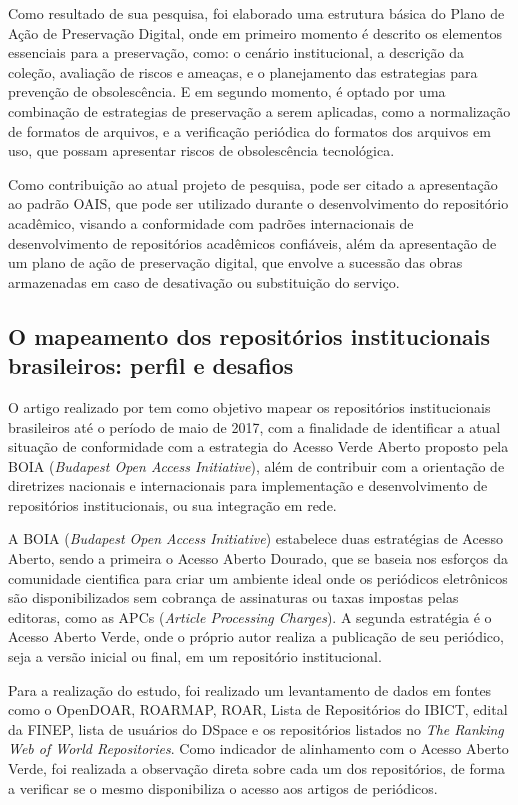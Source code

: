 Como resultado de sua pesquisa, foi elaborado uma estrutura básica
do Plano de Ação de Preservação Digital, onde em primeiro momento
é descrito os elementos essenciais para a preservação, como: o cenário
institucional, a descrição da coleção, avaliação de riscos e ameaças,
e o planejamento das estrategias para prevenção de obsolescência. E em
segundo momento, é optado por uma combinação de estrategias de preservação
a serem aplicadas, como a normalização de formatos de arquivos, e a verificação
periódica do formatos dos arquivos em uso, que possam apresentar riscos
de obsolescência tecnológica.

Como contribuição ao atual projeto de pesquisa, pode ser citado a
apresentação ao padrão OAIS, que pode ser utilizado durante o desenvolvimento
do repositório acadêmico, visando a conformidade com padrões internacionais
de desenvolvimento de repositórios acadêmicos confiáveis, além da apresentação
de um plano de ação de preservação digital, que envolve a sucessão das obras
armazenadas em caso de desativação ou substituição do serviço.

\subsection{O mapeamento dos repositórios institucionais brasileiros: perfil e desafios}

O artigo realizado por \cite{2019:Weitzel} tem como objetivo mapear
os repositórios institucionais brasileiros até o período de maio de 2017,
com a finalidade de identificar a atual situação de conformidade com
a estrategia do Acesso Verde Aberto proposto pela BOIA (\emph{Budapest Open Access Initiative}),
além de contribuir com a orientação de diretrizes nacionais e internacionais
para implementação e desenvolvimento de repositórios institucionais, ou sua integração
em rede.

A BOIA (\emph{Budapest Open Access Initiative}) estabelece duas estratégias
de Acesso Aberto, sendo a primeira o Acesso Aberto Dourado, que se baseia
nos esforços da comunidade cientifica para criar um ambiente ideal onde
os periódicos eletrônicos são disponibilizados sem cobrança de assinaturas
ou taxas impostas pelas editoras, como as APCs (\emph{Article Processing Charges}).
A segunda estratégia é o Acesso Aberto Verde, onde o próprio autor
realiza a publicação de seu periódico, seja a versão inicial ou
final, em um repositório institucional.

Para a realização do estudo, foi realizado um levantamento de dados em
fontes como o OpenDOAR, ROARMAP, ROAR, Lista de Repositórios do IBICT,
edital da FINEP, lista de usuários do DSpace e os repositórios listados
no \emph{The Ranking Web of World Repositories}. Como indicador de
alinhamento com o Acesso Aberto Verde, foi realizada a observação
direta sobre cada um dos repositórios, de forma a verificar se o mesmo
disponibiliza o acesso aos artigos de periódicos.

